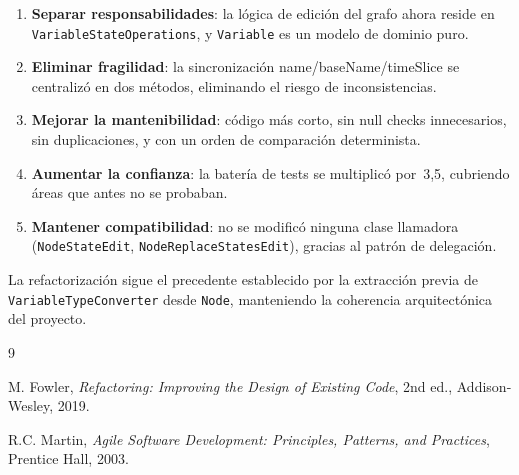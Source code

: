 \documentclass[11pt,a4paper]{article}
\newcommand{\code}[1]{\texttt{#1}}
\begin{document}
\begin{enumerate}
  \item \textbf{Separar responsabilidades}: la l\'ogica de edici\'on del
        grafo ahora reside en \code{VariableStateOperations}, y
        \code{Variable} es un modelo de dominio puro.
  \item \textbf{Eliminar fragilidad}: la sincronizaci\'on
        name/baseName/timeSlice se centraliz\'o en dos m\'etodos,
        eliminando el riesgo de inconsistencias.
  \item \textbf{Mejorar la mantenibilidad}: c\'odigo m\'as corto, sin
        null checks innecesarios, sin duplicaciones, y con un orden de
        comparaci\'on determinista.
  \item \textbf{Aumentar la confianza}: la bater\'ia de tests se
        multiplic\'o por~3,5, cubriendo \'areas que antes no se probaban.
  \item \textbf{Mantener compatibilidad}: no se modific\'o ninguna clase
        llamadora (\code{NodeStateEdit}, \code{NodeReplaceStatesEdit}),
        gracias al patr\'on de delegaci\'on.
\end{enumerate}

La refactorizaci\'on sigue el precedente establecido por la extracci\'on
previa de \code{VariableTypeConverter} desde \code{Node}, manteniendo la
coherencia arquitect\'onica del proyecto.

\begin{thebibliography}{9}

  M. Fowler,
  \emph{Refactoring: Improving the Design of Existing Code},
  2nd ed., Addison-Wesley, 2019.

  R.C. Martin,
  \emph{Agile Software Development: Principles, Patterns, and Practices},
  Prentice Hall, 2003.

\end{thebibliography}
\end{document}
